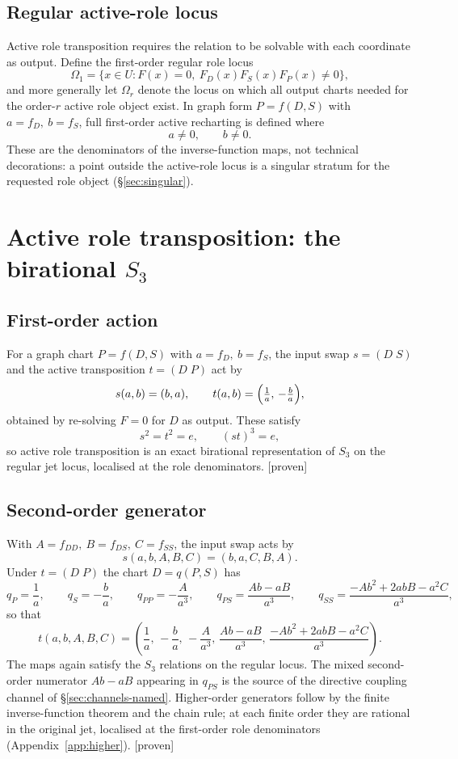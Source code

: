 \documentclass[11pt]{article}
\newcommand{\Proven}{\textsf{[proven]}}
\theoremstyle{plain}
\theoremstyle{definition}
\newcommand{\Reg}{\Omega}
\begin{document}
\subsection{Regular active-role locus}
Active role transposition requires the relation to be solvable with each coordinate as output. Define
the first-order regular role locus
\[
\Reg_1=\{x\in U: F(x)=0,\ F_D(x)F_S(x)F_P(x)\ne0\},
\]
and more generally let $\Reg_r$ denote the locus on which all output charts needed for the order-$r$
active role object exist. In graph form $P=f(D,S)$ with $a=f_D,\ b=f_S$, full first-order active
recharting is defined where
\[
a\ne0,\qquad b\ne0 .
\]
These are the denominators of the inverse-function maps, not technical decorations: a point outside
the active-role locus is a singular stratum for the requested role object (\S\ref{sec:singular}).

\section{Active role transposition: the birational \texorpdfstring{$S_3$}{S3}}
\label{sec:transpose}

\subsection{First-order action}
For a graph chart $P=f(D,S)$ with $a=f_D,\ b=f_S$, the input swap $s=(D\;S)$ and the active
transposition $t=(D\;P)$ act by
\[
s(a,b)=(b,a),
\qquad
t(a,b)=\Bigl(\tfrac1a,\,-\tfrac ba\Bigr),
\]
obtained by re-solving $F=0$ for $D$ as output. These satisfy
\[
s^2=t^2=e,\qquad (st)^3=e,
\]
so active role transposition is an exact birational representation of $S_3$ on the regular jet locus,
localised at the role denominators. \Proven

\subsection{Second-order generator}
With $A=f_{DD},\ B=f_{DS},\ C=f_{SS}$, the input swap acts by
\[
s(a,b,A,B,C)=(b,a,C,B,A).
\]
Under $t=(D\;P)$ the chart $D=q(P,S)$ has
\[
q_P=\frac1a,\qquad q_S=-\frac ba,\qquad
q_{PP}=-\frac{A}{a^3},\qquad
q_{PS}=\frac{Ab-aB}{a^3},\qquad
q_{SS}=\frac{-Ab^2+2abB-a^2C}{a^3},
\]
so that
\[
t(a,b,A,B,C)=
\left(\frac1a,\,-\frac ba,\,-\frac{A}{a^3},\,\frac{Ab-aB}{a^3},\,
\frac{-Ab^2+2abB-a^2C}{a^3}\right).
\]
The maps again satisfy the $S_3$ relations on the regular locus. The mixed second-order numerator
$Ab-aB$ appearing in $q_{PS}$ is the source of the directive coupling channel of
\S\ref{sec:channels-named}. Higher-order generators follow by the finite inverse-function theorem and
the chain rule; at each finite order they are rational in the original jet, localised at the
first-order role denominators (Appendix~\ref{app:higher}). \Proven
\end{document}
